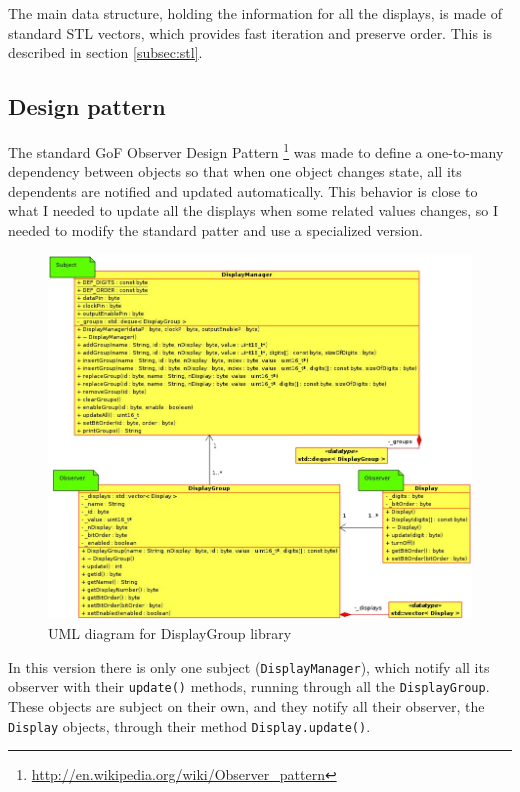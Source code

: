 \documentclass[11pt,english]{article}
\newcommand{\code}[1]{\texttt{#1}}
\begin{document}
The main data structure, holding the information for all the displays, is made of standard STL vectors, 
which provides fast iteration and preserve order. This is described in section \ref{subsec:stl}.



\subsection{Design pattern}\label{subsec:design}

The standard GoF Observer Design Pattern \footnote{\url{http://en.wikipedia.org/wiki/Observer_pattern}} 
was made to define a one-to-many dependency between objects so that when one object changes state, all 
its dependents are notified and updated automatically. This behavior is close to what I needed to update 
all the displays when some related values changes, so I needed to modify the standard patter and use a 
specialized version.

%
\begin{figure}[htb]
\centering\includegraphics[scale=0.65]{img/UML}

\caption{UML diagram for DisplayGroup library \label{fig:uml}}

\end{figure}

In this version there is only one subject (\code{DisplayManager}), which notify all its observer with their 
\code{update()} methods, running through all the \code{DisplayGroup}. These objects are subject on their own, 
and they notify all their observer, the \code{Display} objects, through their method \code{Display.update()}. 
\end{document}
